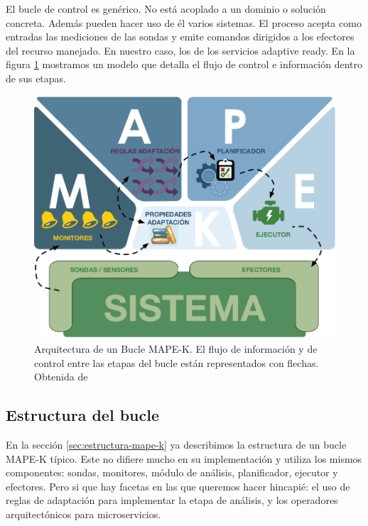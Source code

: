 El bucle de control es genérico. No está acoplado a un dominio o solución concreta. Además pueden hacer uso de él varios sistemas. El proceso acepta como entradas las mediciones de las sondas y emite comandos dirigidos a los efectores del recurso manejado. En nuestro caso, los  de los servicios adaptive ready. En la figura \ref{fig:bucle-mapek3} mostramos un modelo que detalla el flujo de control e información dentro de sus etapas.

\begin{figure}[htb]
  \centering
  \includegraphics[scale=1.1]{cap_introduccion/images/bucle-mape-k}
  \caption[Arquitectura de un Bucle MAPE-K. El flujo de información y de control entre las etapas del bucle están representados con flechas.]{Arquitectura de un Bucle MAPE-K. El flujo de información y de control entre las etapas del bucle están representados con flechas. Obtenida de \cite{fonsEspecificacionSistemasAutoadaptativos2021}}
  \label{fig:bucle-mapek3}
\end{figure}

\subsection{Estructura del bucle}

En la sección \ref{sec:estructura-mape-k} ya describimos la estructura de un bucle MAPE-K típico. Este no difiere mucho en su implementación y utiliza los mismos componentes: sondas, monitores, módulo de análisis, planificador, ejecutor y efectores. Pero si que hay facetas en las que queremos hacer hincapié: el uso de reglas de adaptación para implementar la etapa de análisis, y los operadores arquitectónicos para microservicios.

